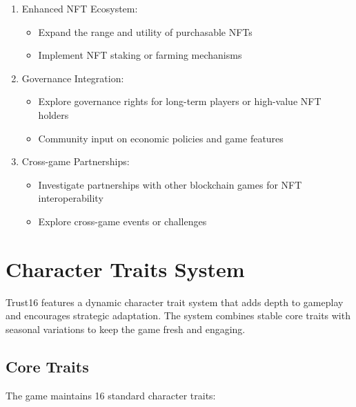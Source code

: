 \documentclass[]{article}
\begin{document}
\begin{enumerate}
\item Enhanced NFT Ecosystem:
   \begin{itemize}
   \item Expand the range and utility of purchasable NFTs
   \item Implement NFT staking or farming mechanisms
   \end{itemize}
\item Governance Integration:
   \begin{itemize}
   \item Explore governance rights for long-term players or high-value NFT holders
   \item Community input on economic policies and game features
   \end{itemize}
\item Cross-game Partnerships:
   \begin{itemize}
   \item Investigate partnerships with other blockchain games for NFT interoperability
   \item Explore cross-game events or challenges
   \end{itemize}
\end{enumerate}

\section{Character Traits System}

Trust16 features a dynamic character trait system that adds depth to gameplay and encourages strategic adaptation. The system combines stable core traits with seasonal variations to keep the game fresh and engaging.

\subsection{Core Traits}

The game maintains 16 standard character traits:
\end{document}

